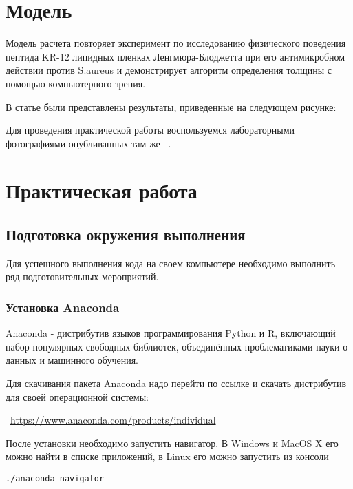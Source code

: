 \documentclass[11pt]{article}
\begin{document}
\section{Модель}
Модель расчета повторяет эксперимент по исследованию физического поведения пептида KR-12 липидных пленках Ленгмюра-Блоджетта при его антимикробном действии против S.aureus и демонстрирует алгоритм определения толщины с помощью компьютерного зрения. ~\cite{Chanci}

В статье были представлены результаты, приведенные на следующем рисунке:

    \begin{center}
    \end{center}    

Для проведения практической работы воспользуемся лабораторными фотографиями опубливанных там же ~\cite{Chanci}.
    
    
\section{Практическая работа}        
    \subsection{Подготовка окружения выполнения}
Для успешного выполнения кода на своем компьютере необходимо выполнить ряд подготовительных мероприятий.

\subsubsection{Установка Anaconda}
Anaconda - дистрибутив языков программирования Python и R, включающий набор популярных свободных библиотек, объединённых проблематиками науки о данных и машинного обучения.

Для скачивания пакета Anaconda надо перейти по ссылке и скачать дистрибутив для своей операционной системы:

~\url{https://www.anaconda.com/products/individual}

    \begin{center}
    \end{center}

После установки необходимо запустить навигатор. В Windows и MacOS X его можно найти в списке приложений, в Linux его можно запустить  из консоли 
    \begin{Verbatim}[commandchars=\\\{\}]
./anaconda-navigator
    \end{Verbatim}
     
\end{document}
